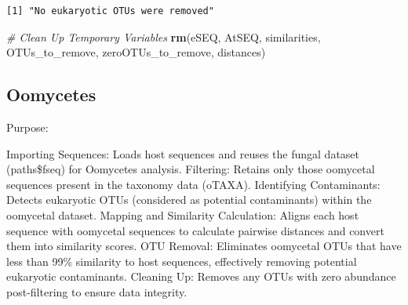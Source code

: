 \documentclass[
  11pt,
]{article}
\newenvironment{Shaded}{\begin{snugshade}}{\end{snugshade}}
\newcommand{\CommentTok}[1]{\textcolor[rgb]{0.56,0.35,0.01}{\textit{#1}}}
\newcommand{\FunctionTok}[1]{\textcolor[rgb]{0.13,0.29,0.53}{\textbf{#1}}}
\newcommand{\NormalTok}[1]{#1}
\begin{document}
\begin{verbatim}
[1] "No eukaryotic OTUs were removed"
\end{verbatim}

\begin{Shaded}
\begin{Highlighting}[]
\CommentTok{\# Clean Up Temporary Variables}
\FunctionTok{rm}\NormalTok{(eSEQ, AtSEQ, similarities, OTUs\_to\_remove, zeroOTUs\_to\_remove, distances)}
\end{Highlighting}
\end{Shaded}

\subsection{Oomycetes}\label{oomycetes}

Purpose:

Importing Sequences: Loads host sequences and reuses the fungal dataset
(paths\$fseq) for Oomycetes analysis. Filtering: Retains only those
oomycetal sequences present in the taxonomy data (oTAXA). Identifying
Contaminants: Detects eukaryotic OTUs (considered as potential
contaminants) within the oomycetal dataset. Mapping and Similarity
Calculation: Aligns each host sequence with oomycetal sequences to
calculate pairwise distances and convert them into similarity scores.
OTU Removal: Eliminates oomycetal OTUs that have less than 99\%
similarity to host sequences, effectively removing potential eukaryotic
contaminants. Cleaning Up: Removes any OTUs with zero abundance
post-filtering to ensure data integrity.
\end{document}
